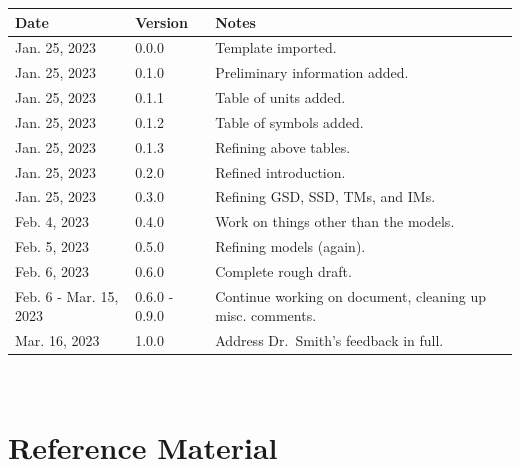\documentclass[12pt]{article}
\begin{document}
\begin{tabularx}{\textwidth}{p{3cm}p{2cm}X}
    \toprule {\bf Date}    & {\bf Version} & {\bf Notes}                                               \\
    \midrule
    Jan. 25, 2023          & 0.0.0         & Template imported.                                        \\
    Jan. 25, 2023          & 0.1.0         & Preliminary information added.                            \\
    Jan. 25, 2023          & 0.1.1         & Table of units added.                                     \\
    Jan. 25, 2023          & 0.1.2         & Table of symbols added.                                   \\
    Jan. 25, 2023          & 0.1.3         & Refining above tables.                                    \\
    Jan. 25, 2023          & 0.2.0         & Refined introduction.                                     \\
    Jan. 25, 2023          & 0.3.0         & Refining GSD, SSD, TMs, and IMs.                          \\
    Feb. 4, 2023           & 0.4.0         & Work on things other than the models.                     \\
    Feb. 5, 2023           & 0.5.0         & Refining models (again).                                  \\
    Feb. 6, 2023           & 0.6.0         & Complete rough draft.                                     \\
    Feb. 6 - Mar. 15, 2023 & 0.6.0 - 0.9.0 & Continue working on document, cleaning up misc. comments. \\
    Mar. 16, 2023          & 1.0.0         & Address Dr.~Smith's feedback in full.                     \\
    \bottomrule
\end{tabularx}

~\newpage


\section{Reference Material}
\end{document}
